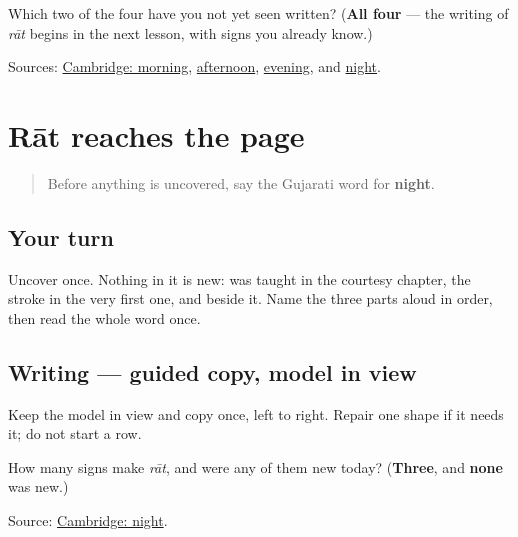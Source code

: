 \begin{tcolorbox}[breakable,colback=teal!4,colframe=teal!35!black,title={Before you move on}]
Which two of the four have you not yet seen written? (\textbf{All four} — the writing of \emph{rāt} begins in the next lesson, with signs you already know.)

Sources: \href{https://dictionary.cambridge.org/dictionary/english-gujarati/morning}{Cambridge: morning}, \href{https://dictionary.cambridge.org/dictionary/english-gujarati/afternoon}{afternoon}, \href{https://dictionary.cambridge.org/dictionary/english-gujarati/evening}{evening}, and \href{https://dictionary.cambridge.org/dictionary/english-gujarati/night}{night}.
\end{tcolorbox}
\section[Practice]{Rāt reaches the page}

\label{lesson:GU-C24-raat}



\begin{quote}
Before anything is uncovered, say the Gujarati word for \textbf{night}.
\end{quote}

\subsection*{Your turn}
Uncover \textbf{} once. Nothing in it is new: \textbf{} was taught in the courtesy chapter, the \textbf{} stroke in the very first one, and \textbf{} beside it. Name the three parts aloud in order, then read the whole word once.

\subsection*{Writing — guided copy, model in view}
Keep the model in view and copy \textbf{} once, left to right. Repair one shape if it needs it; do not start a row.

\begin{tcolorbox}[breakable,colback=teal!4,colframe=teal!35!black,title={Before you move on}]
How many signs make \emph{rāt}, and were any of them new today? (\textbf{Three}, and \textbf{none} was new.)

Source: \href{https://dictionary.cambridge.org/dictionary/english-gujarati/night}{Cambridge: night}.
\end{tcolorbox}

